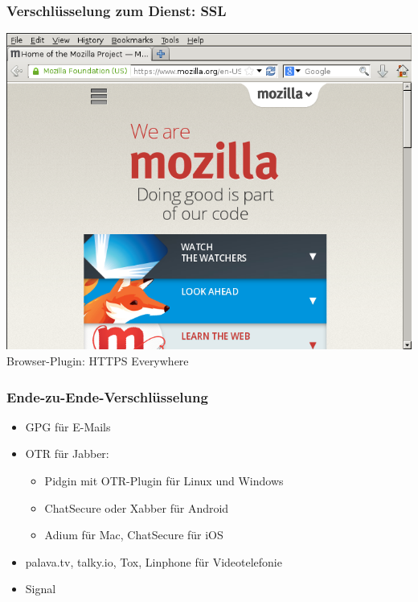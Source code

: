 \documentclass[12pt]{beamer}
\begin{document}
\begin{frame}
    \frametitle{Verschlüsselung zum Dienst: SSL}
    \begin{center}
      \includegraphics[height=0.6\textheight]{img/ssl_special.png}
      \\
      \vspace{3mm}
      Browser-Plugin: HTTPS Everywhere
    \end{center}
\end{frame}

\begin{frame}
  \frametitle{Ende-zu-Ende-Verschlüsselung}
  \begin{itemize}
    \item<1-> GPG für E-Mails
    \item<2-> OTR für Jabber:
      \begin{itemize}
        \item Pidgin mit OTR-Plugin für Linux und Windows
        \item ChatSecure oder Xabber für Android
        \item Adium für Mac, ChatSecure für iOS
      \end{itemize}
    \item<3-> palava.tv, talky.io, Tox, Linphone für Videotelefonie
    \item<4-> Signal
  \end{itemize}
\end{frame}
\end{document}
